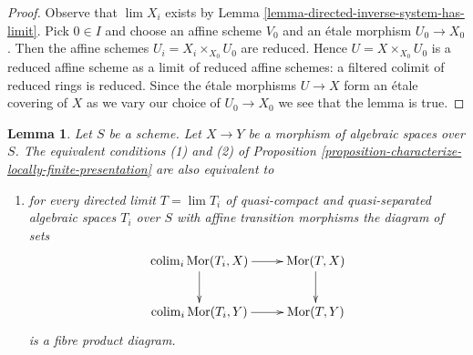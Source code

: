 \documentclass{stacks-project}
\theoremstyle{plain}
\newtheorem{lemma}[subsection]{Lemma}
\theoremstyle{definition}
\theoremstyle{remark}
\numberwithin{equation}{subsection}
\def\lim{\mathop{\mathrm{lim}}\nolimits}
\def\colim{\mathop{\mathrm{colim}}\nolimits}
\def\Mor{\mathop{\mathrm{Mor}}\nolimits}
\begin{document}
\begin{proof}
Observe that $\lim X_i$ exists by
Lemma \ref{lemma-directed-inverse-system-has-limit}.
Pick $0 \in I$ and choose an affine scheme $V_0$ and an \'etale morphism
$U_0 \to X_0$. Then the affine schemes
$U_i = X_i \times_{X_0} U_0$ are reduced.
Hence $U = X \times_{X_0} U_0$
is a reduced affine scheme as a limit of reduced affine schemes:
a filtered colimit of reduced rings is reduced.
Since the \'etale morphisms $U \to X$ form an
\'etale covering of $X$ as we vary our choice of $U_0 \to X_0$
we see that the lemma is true.
\end{proof}

\begin{lemma}
\label{lemma-better-characterize-relative-limit-preserving}
Let $S$ be a scheme. Let $X \to Y$ be a morphism of algebraic spaces
over $S$. The equivalent conditions (1) and (2) of
Proposition \ref{proposition-characterize-locally-finite-presentation}
are also equivalent to
\begin{enumerate}
\item[(3)] for every directed limit $T = \lim T_i$ of quasi-compact
and quasi-separated algebraic spaces $T_i$ over $S$ with affine
transition morphisms the diagram of sets
$$
\xymatrix{
\colim_i \Mor(T_i, X) \ar[r] \ar[d] & \Mor(T, X) \ar[d] \\
\colim_i \Mor(T_i, Y) \ar[r] & \Mor(T, Y)
}
$$
is a fibre product diagram.
\end{enumerate}
\end{lemma}
\end{document}
